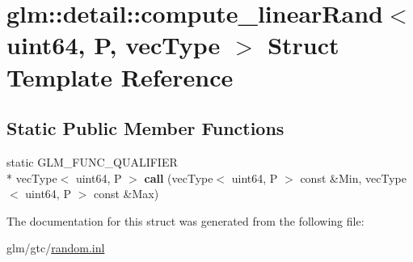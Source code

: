 \hypertarget{structglm_1_1detail_1_1compute__linearRand_3_01uint64_00_01P_00_01vecType_01_4}{\section{glm\-:\-:detail\-:\-:compute\-\_\-linear\-Rand$<$ uint64, P, vec\-Type $>$ Struct Template Reference}
\label{structglm_1_1detail_1_1compute__linearRand_3_01uint64_00_01P_00_01vecType_01_4}
}
\subsection*{Static Public Member Functions}
\begin{DoxyCompactItemize}
\item 
\hypertarget{structglm_1_1detail_1_1compute__linearRand_3_01uint64_00_01P_00_01vecType_01_4_afc443abbff12752de8c78096639a6ff4}{static G\-L\-M\-\_\-\-F\-U\-N\-C\-\_\-\-Q\-U\-A\-L\-I\-F\-I\-E\-R \\*
vec\-Type$<$ uint64, P $>$ {\bfseries call} (vec\-Type$<$ uint64, P $>$ const \&Min, vec\-Type$<$ uint64, P $>$ const \&Max)}\label{structglm_1_1detail_1_1compute__linearRand_3_01uint64_00_01P_00_01vecType_01_4_afc443abbff12752de8c78096639a6ff4}

\end{DoxyCompactItemize}


The documentation for this struct was generated from the following file\-:\begin{DoxyCompactItemize}
\item 
glm/gtc/\hyperlink{random_8inl}{random.\-inl}\end{DoxyCompactItemize}
